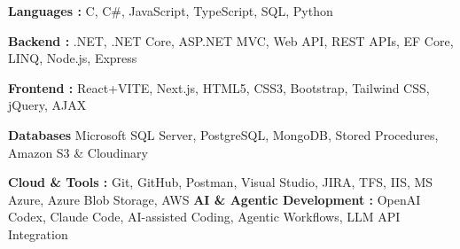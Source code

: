
\begin{cvskills}

  \cvskill
    {\textbf{Languages :}}
    {C, C\#, JavaScript, TypeScript, SQL, Python}

  \cvskill
    {\textbf{Backend :}}
    {.NET, .NET Core, ASP.NET MVC, Web API, REST APIs, EF Core, LINQ, Node.js, Express}

  \cvskill
    {\textbf{Frontend :}}
    {React+VITE, Next.js, HTML5, CSS3, Bootstrap, Tailwind CSS, jQuery, AJAX}

  \cvskill
    {\textbf{Databases}}
    {Microsoft SQL Server, PostgreSQL, MongoDB, Stored Procedures, Amazon S3 \& Cloudinary}

  \cvskill
    {\textbf{Cloud \& Tools :}}
    {Git, GitHub, Postman, Visual Studio, JIRA, TFS, IIS, MS Azure, Azure Blob Storage, AWS}
    \cvskill
{\textbf{AI \& Agentic Development :}}
{OpenAI Codex, Claude Code, AI-assisted Coding, Agentic Workflows, LLM API Integration}

\end{cvskills}
